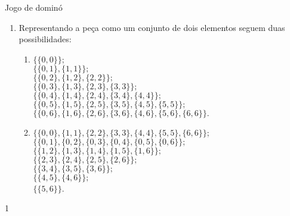 \begin{answer}{Jogo de dominó}
{
\begin{enumerate}
\item Representando a peça como um conjunto de dois elementos seguem  duas possibilidades:
\begin{enumerate}[leftmargin=0pt, label=\titem{\arabic*.}]\small
\item 
$\{\{0,0\}\};$ \\
$\{\{0,1\}, \{1,1\}\};$\\
$\{\{0,2\}, \{1,2\}, \{2,2\}\};$\\
$\{\{0,3\}, \{1,3\}, \{2,3\}, \{3,3\}\};$\\
$\{\{0,4\}, \{1,4\}, \{2,4\}, \{3,4\}, \{4,4\}\};$\\
$\{\{0,5\}, \{1,5\}, \{2,5\}, \{3,5\}, \{4,5\}, \{5,5\}\};$\\
$\{\{0,6\}, \{1,6\}, \{2,6\}, \{3,6\}, \{4,6\}, \{5,6\}, \{6,6\}\}.$

\item
$\{\{0,0\}, \{1,1\},\{2,2\},\{3,3\}, \{4,4\}, \{5,5\}, \{6,6\} \};$ \\
$\{\{0,1\},\{0,2\},\{0,3\}, \{0,4\}, \{0,5\}, \{0,6\}  \};$\\
$\{\{1,2\}, \{1,3\}, \{1,4\}, \{1,5\}, \{1,6\}\};$\\
$\{\{2,3\}, \{2,4\}, \{2,5\}, \{2,6\}\};$\\
$\{\{3,4\}, \{3,5\}, \{3,6\}\};$\\
$\{ \{4,5\}, \{4,6\}\};$\\
$\{\{5,6\}\}$.\\
\end{enumerate}
\end{enumerate}
}{1}
\end{answer}

